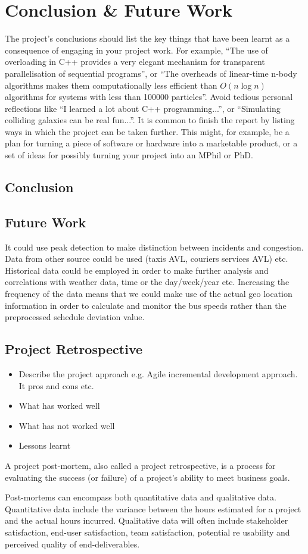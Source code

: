 \chapter{Conclusion \& Future Work}

The project's conclusions should list the key things that have been learnt as a consequence of engaging in your project work. For example, ``The use of overloading in C++ provides a very elegant mechanism for transparent parallelisation of sequential programs'', or ``The overheads of linear-time n-body algorithms makes them computationally less efficient than $O(n \log n)$ algorithms for systems with less than 100000 particles''. Avoid tedious personal reflections like ``I learned a lot about C++ programming...'', or ``Simulating colliding galaxies can be real fun...''. It is common to finish the report by listing ways in which the project can be taken further. This might, for example, be a plan for turning a piece of software or hardware into a marketable product, or a set of ideas for possibly turning your project into an MPhil or PhD.

\section{Conclusion}

\section{Future Work}
It could use peak detection to make distinction between incidents and congestion.
Data from other source could be used (taxis AVL, couriers services AVL) etc.
Historical data could be employed in order to make further analysis and correlations with weather data, time or the day/week/year etc.
Increasing the frequency of the data means that we could make use of the actual geo location information in order to calculate and monitor the bus speeds rather than the preprocessed schedule deviation value.

\section{Project Retrospective}
\begin{itemize}
	\item Describe the project approach e.g. Agile incremental development approach. It pros and cons etc. 
	\item What has worked well
	\item What has not worked well
	\item Lessons learnt
\end{itemize}

A project post-mortem, also called a project retrospective, is a process for evaluating the success (or failure) of a project's ability to meet business goals. 

Post-mortems can encompass both quantitative data and qualitative data. Quantitative data include the variance between the hours estimated for a project and the actual hours incurred. Qualitative data will often include stakeholder satisfaction, end-user satisfaction, team satisfaction, potential re usability and perceived quality of end-deliverables.